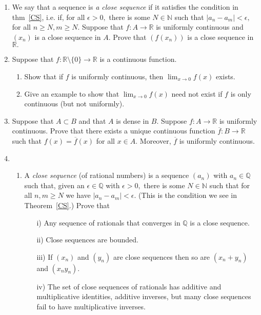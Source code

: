 \documentclass[openany, amssymb, psamsfonts]{amsart}
\newcommand{\bbN}{\mathbb{N}}
\newcommand{\bbQ}{\mathbb{Q}}
\newcommand{\bbR}{\mathbb{R}}
\theoremstyle{definition}
\numberwithin{equation}{section}
\begin{document}
\begin{enumerate}
\item We say that a sequence is {\em a close sequence} if it satisfies the condition in thm~\ref{CS}, i.e. if, for all $\epsilon >0,$ there is some $N\in \bbN$ such that $|a_n-a_m|<\epsilon,$ for all $n\geq N, m\geq N.$ Suppose that $f\colon A\longrightarrow \bbR$ is uniformly continuous and $(x_n)$ is a close sequence in $A.$ Prove that $(f(x_n))$ is a close sequence in $\bbR.$

\item Suppose that $f: \bbR\setminus\{0\}\to\bbR$ is a continuous function.
\begin{enumerate}
\item Show that if $f$ is uniformly continuous, then $\displaystyle\lim_{x\to 0}f(x)$ exists.
\item Give an example to show that $\displaystyle\lim_{x\to 0}f(x)$ need not exist if $f$ is only continuous (but not uniformly).
\end{enumerate}

\item
Suppose that $A \subset B$ and that $A$ is dense in $B$.  Suppose $f: A \to \bbR$ is uniformly continuous. Prove that there exists a unique continuous function $\overline f : B \to \bbR$ such that $f(x) = \overline f(x)$ for all $x \in A$.  Moreover, $\overline f$ is uniformly continuous.

\item
\begin{enumerate}
\item
A {\em close sequence} (of rational numbers) is a sequence $(a_n)$ with $a_n\in\bbQ$ such that, given an $\epsilon\in\bbQ$ with $\epsilon>0,$ there is some $N\in\bbN$ such that for all $n,m\geq N$ we have $|a_n-a_m|<\epsilon.$ (This is the condition we see in Theorem~\ref{CS}.) Prove that 
\begin{enumerate}
\item[i)] Any sequence of rationals that converges in $\bbQ$ is a close sequence. 
\item[ii)] Close sequences are bounded. 
\item[iii)] If $(x_n)$ and $(y_n)$ are close sequences then so are $(x_n+y_n)$ and $(x_n y_n).$ 
\item[iv)] The set of close sequences of rationals has additive and multiplicative identities, additive inverses, but many close sequences fail to have multiplicative inverses.
\end{enumerate}






\end{enumerate}
\end{enumerate}
\end{document}
